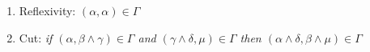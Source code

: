 %
\begin{enumerate}
    \item Reflexivity: $(\alpha, \alpha) \in \Gamma$
    \item Cut: \textit{if $(\alpha, \beta \land \gamma) \in \Gamma$ and $(\gamma \land \delta, \mu)\in \Gamma$ then $(\alpha \land \delta, \beta \land \mu)\in \Gamma$}
\end{enumerate}
